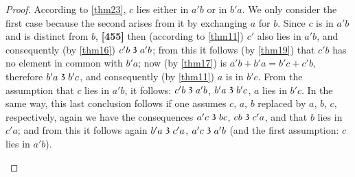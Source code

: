 \documentclass[leqno,hidelinks,a4paper]{article}
\theoremstyle{definition}
\newcommand\partof{\mathrel{\raisebox{0.45ex}{$\mathfrak{3}$}}}
\begin{document}
\begin{proof}
According to \ref{thm23}, $c$ lies either in $a'b$ or in $b'a$. We only consider the first case because the second arises from it by exchanging $a$ for $b$.
Since $c$ is in $a'b$ and is distinct from $b$, \textbf{[455]} then (according to \ref{thm11}) $c'$ also lies in $a'b$, and consequently (by \ref{thm16}) $c'b \partof a'b$; from this it follows (by \ref{thm19}) that $c'b$ has no element in common with $b'a$; now (by \ref{thm17}) is $a'b+b'a=b'c+c'b$, therefore $b'a \partof b'c$, and consequently (by \ref{thm11}) $a$ is in $b'c$.
From the assumption that $c$ lies in $a'b$, it follows: $c'b \partof a'b$, $b'a \partof b'c$, $a$ lies in $b'c$.
In the same way, this last conclusion follows if one assumes $c$, $a$, $b$ replaced by $a$, $b$, $c$, respectively, again we have the consequences $a'c \partof bc$, $cb \partof c'a$, and that $b$ lies in $c'a$; and from this it follows again $b'a \partof c'a$, $a'c \partof a'b$ (and the first assumption: $c$ lies in $a'b$).

\bigskip
\begin{center}
\end{center}
\end{proof}
\end{document}

